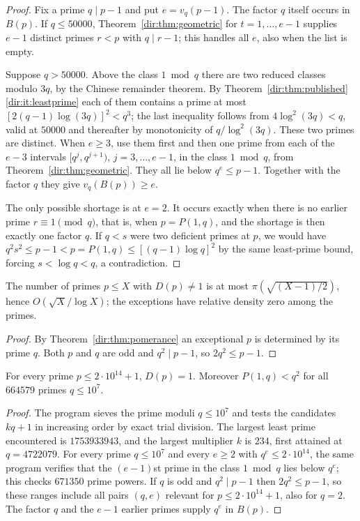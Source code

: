 \begin{proof}
Fix a prime $q\mid p-1$ and put $e=v_q(p-1)$. The factor $q$ itself occurs in $B(p)$.
If $q\le50000$, Theorem~\ref{dir:thm:geometric} for $t=1,\dots,e-1$ supplies $e-1$ distinct
primes $r<p$ with $q\mid r-1$; this handles all $e$, also when the list is empty.

Suppose $q>50000$. Above the class $1\bmod q$ there are two reduced classes modulo
$3q$, by the Chinese remainder theorem.
By Theorem~\ref{dir:thm:published}\ref{dir:it:leastprime} each of them contains a prime at
most $[2(q-1)\log(3q)]^2<q^3$; the last inequality follows from $4\log^2(3q)<q$, valid
at $50000$ and thereafter by monotonicity of $q/\log^2(3q)$. These two primes are
distinct. When $e\ge3$, use them first and then one prime from each of the $e-3$
intervals $[q^j,q^{j+1})$, $j=3,\dots,e-1$, in the class $1\bmod q$, from
Theorem~\ref{dir:thm:geometric}. They all lie below $q^e\le p-1$. Together with the factor $q$
they give $v_q(B(p))\ge e$.

The only possible shortage is at $e=2$. It occurs exactly when there is no earlier
prime $r\equiv1\pmod q$, that is, when $p=P(1,q)$, and the shortage is then exactly one
factor $q$. If $q<s$ were two deficient primes at $p$, we would have
$q^2s^2\le p-1<p=P(1,q)\le[(q-1)\log q]^2$ by the same least-prime bound, forcing
$s<\log q<q$, a contradiction.
\end{proof}

\begin{corollary}\label{dir:cor:pomfreq}
The number of primes $p\le X$ with $D(p)\ne1$ is at most $\pi(\sqrt{(X-1)/2})$, hence
$O(\sqrt X/\log X)$; the exceptions have relative density zero among the primes.
\end{corollary}

\begin{proof}
By Theorem~\ref{dir:thm:pomerance} an exceptional $p$ is determined by its prime $q$. Both $p$
and $q$ are odd and $q^2\mid p-1$, so $2q^2\le p-1$.
\end{proof}

\begin{proposition}\label{dir:prop:pomfinite}
For every prime $p\le2\cdot10^{14}+1$, $D(p)=1$. Moreover $P(1,q)<q^2$ for all $664579$
primes $q\le10^7$.
\end{proposition}

\begin{proof}
The program  sieves the
prime moduli $q\le10^7$ and tests the candidates $kq+1$ in increasing order by exact
trial division. The largest least prime encountered is $1753933943$, and the largest
multiplier $k$ is $234$, first attained at $q=4722079$. For every prime $q\le10^7$ and
every $e\ge2$ with $q^e\le2\cdot10^{14}$, the same program verifies that the
$(e-1)$st prime in the class $1\bmod q$ lies below $q^e$; this checks $671350$ prime
powers. If $q$ is odd and $q^2\mid p-1$ then $2q^2\le p-1$, so these ranges include all
pairs $(q,e)$ relevant for $p\le2\cdot10^{14}+1$, also for $q=2$. The factor $q$ and the
$e-1$ earlier primes supply $q^e$ in $B(p)$.
\end{proof}


